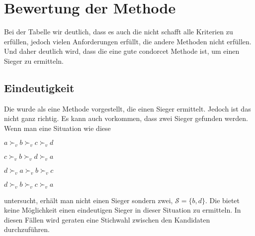 \section{Bewertung der Methode}
\label{sec:Bewertung1}









Bei der Tabelle wir deutlich, dass es auch die \schulze nicht schafft alle Kriterien zu erfüllen, jedoch vielen Anforderungen erfüllt, die andere Methoden nicht erfüllen. Und daher deutlich wird, dass die \schulze eine gute condorcet Methode ist, um einen Sieger zu ermitteln.
\newpage

\subsection{Eindeutigkeit}
\label{sec:eindeutigkeit}
Die \schulze wurde als eine Methode vorgestellt, die einen Sieger ermittelt. Jedoch ist das nicht ganz richtig. Es kann auch vorkommen, dass zwei Sieger gefunden werden. Wenn man eine Situation wie diese

\begin{description}
\centering
\item[3 mal] $a \succ_{v} b \succ_{v} c \succ_{v}d$
\item[2 mal] $c \succ_{v} b \succ_{v} d \succ_{v}a$
\item[2 mal] $d \succ_{v} a \succ_{v} b \succ_{v}c$
\item[2 mal] $d \succ_{v} b \succ_{v} c \succ_{v}a$
\end{description} 
untersucht, erhält man nicht einen Sieger sondern zwei, $\mathcal{S}=\{b,d\}$. Die \schulze bietet keine Möglichkeit einen eindeutigen Sieger in dieser Situation zu ermitteln. In diesen Fällen wird geraten eine Stichwahl zwischen den Kandidaten durchzuführen.
